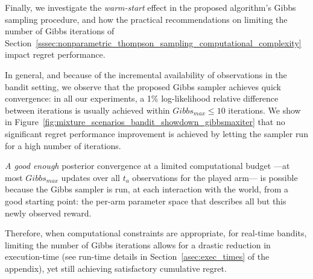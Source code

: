 Finally, we investigate the \textit{warm-start} effect in the proposed algorithm's Gibbs sampling procedure, and how the practical recommendations on limiting the number of Gibbs iterations of Section~\ref{sssec:nonparametric_thompson_sampling_computational_complexity} impact regret performance.

In general, and because of the incremental availability of observations in the bandit setting, we observe that the proposed Gibbs sampler achieves quick convergence: in all our experiments, a 1\% log-likelihood relative difference between iterations is usually achieved within $Gibbs_{max}\leq10$ iterations.
We show in Figure~\ref{fig:mixture_scenarios_bandit_showdown_gibbsmaxiter} that no significant regret performance improvement is achieved by letting the sampler run for a high number of iterations. 

\textit{A good enough} posterior convergence at a limited computational budget ---at most $Gibbs_{max}$ updates over all $t_a$ observations for the played arm--- is possible because the Gibbs sampler is run, at each interaction with the world, from a good starting point: the per-arm parameter space that describes all but this newly observed reward.

Therefore, when computational constraints are appropriate, \eg for real-time bandits, limiting the number of Gibbs iterations allows for a drastic reduction in execution-time (see run-time details in Section~\ref{asec:exec_times} of the appendix), yet still achieving satisfactory cumulative regret.
